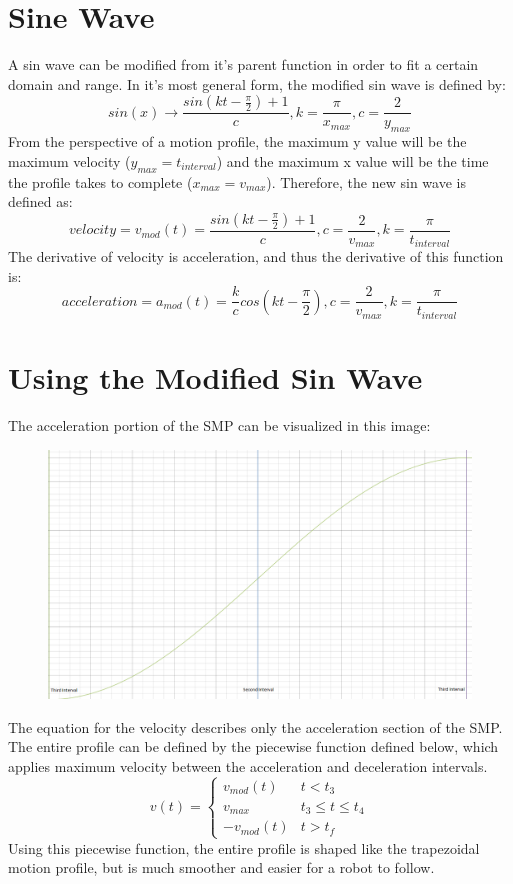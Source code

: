 \documentclass[a4paper,12pt]{report}
\newcommand{\tab}{\hspace{20pt}}
\begin{document}
	\section{Sine Wave}
	\tab A sin wave can be modified from it's parent function in order to fit a certain domain and range. In it's most general form, the modified sin wave is defined by:
	\[sin(x) \rightarrow \frac{sin(kt - \frac{\pi}{2}) + 1}{c}, k = \frac{\pi}{x_{max}}, c = \frac{2}{y_{max}}\]
	\tab From the perspective of a motion profile, the maximum y value will be the maximum velocity ($y_{max} = t_{interval}$) and the maximum x value will be the time the profile takes to complete ($x_{max} = v_{max}$). Therefore, the new sin wave is defined as:
	\[velocity = v_{mod}(t) = \frac{sin(kt - \frac{\pi}{2}) + 1}{c}, c = \frac{2}{v_{max}}, k = \frac{\pi}{t_{interval}}\]
	\tab The derivative of velocity is acceleration, and thus the derivative of this function is:
	\[acceleration = a_{mod}(t) = \frac{k}{c} cos(kt - \frac{\pi}{2}), c = \frac{2}{v_{max}}, k = \frac{\pi}{t_{interval}}\]
	
	\section{Using the Modified Sin Wave}
	\tab The acceleration portion of the SMP can be visualized in this image:
	\begin{figure}[h]
		\centering
		\includegraphics[scale=.3]{acceleration.png}
	\end{figure}
	
	\tab The equation for the velocity describes only the acceleration section of the SMP. The entire profile can be defined by the piecewise function defined below, which applies maximum velocity between the acceleration and deceleration intervals.
	\[v(t) = \begin{cases} 
	v_{mod}(t) & t < t_3  \\
	v_{max} & t_3 \leq t\leq t_4 \\
	-v_{mod}(t) & t > t_f
	\end{cases}\]
	\tab Using this piecewise function, the entire profile is shaped like the trapezoidal motion profile, but is much smoother and easier for a robot to follow.
	
\end{document}
